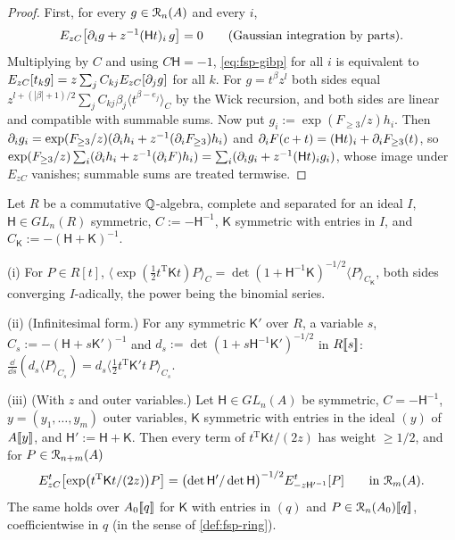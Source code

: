 \begin{proof}
First, for every $g\in\mathcal{R}_n(A)$ and every $i$,
\begin{equation}
\label{eq:fsp-gibp}
E_{zC}\bigl[\partial_ig+z^{-1}(\mathsf Ht)_i\,g\bigr]=0\qquad\text{(Gaussian integration by parts).}
\end{equation}
Multiplying by $C$ and using $C\mathsf H=-1$, \eqref{eq:fsp-gibp} for all $i$ is equivalent to $E_{zC}[t_kg]=z\sum_jC_{kj}E_{zC}[\partial_jg]$ for all $k$. For $g=t^\beta z^l$ both sides equal $z^{l+(|\beta|+1)/2}\sum_jC_{kj}\beta_j\langle t^{\beta-e_j}\rangle_C$ by the Wick recursion, and both sides are linear and compatible with summable sums. Now put $g_i:=\exp(F_{\geq3}/z)h_i$. Then $\partial_ig_i=\exp(F_{\geq3}/z)(\partial_ih_i+z^{-1}(\partial_iF_{\geq3})h_i)$ and $\partial_iF(c+t)=(\mathsf Ht)_i+\partial_iF_{\geq3}(t)$, so $\exp(F_{\geq3}/z)\sum_i(\partial_ih_i+z^{-1}(\partial_iF)h_i)=\sum_i(\partial_ig_i+z^{-1}(\mathsf Ht)_ig_i)$, whose image under $E_{zC}$ vanishes; summable sums are treated termwise.
\end{proof}

\begin{lem}
\label{lem:fsp-pg}
Let $R$ be a commutative $\mathbb{Q}$-algebra, complete and separated for an ideal $I$, $\mathsf H\in GL_n(R)$ symmetric, $C:=-\mathsf H^{-1}$, $\mathsf K$ symmetric with entries in $I$, and $C_{\mathsf K}:=-(\mathsf H+\mathsf K)^{-1}$.

(i) For $P\in R[t]$, $\langle\exp(\frac12t^{\mathrm T}\mathsf Kt)P\rangle_C=\det(1+\mathsf H^{-1}\mathsf K)^{-1/2}\langle P\rangle_{C_{\mathsf K}}$, both sides converging $I$-adically, the power being the binomial series.

(ii) (Infinitesimal form.) For any symmetric $\mathsf K'$ over $R$, a variable $s$, $C_s:=-(\mathsf H+s\mathsf K')^{-1}$ and $d_s:=\det(1+s\mathsf H^{-1}\mathsf K')^{-1/2}$ in $R[\![ s ]\!]$: $\frac{\dd}{\dd s}(d_s\langle P\rangle_{C_s})=d_s\langle\frac12t^{\mathrm T}\mathsf K't\,P\rangle_{C_s}$.

(iii) (With $z$ and outer variables.) Let $\mathsf H\in GL_n(A)$ be symmetric, $C=-\mathsf H^{-1}$, $y=(y_1,\dots,y_m)$ outer variables, $\mathsf K$ symmetric with entries in the ideal $(y)$ of $A[\![ y ]\!]$, and $\mathsf H':=\mathsf H+\mathsf K$. Then every term of $t^{\mathrm T}\mathsf Kt/(2z)$ has weight $\geq1/2$, and for $P\in\mathcal{R}_{n+m}(A)$
\[
E^t_{zC}\bigl[\exp\bigl(t^{\mathrm T}\mathsf Kt/(2z)\bigr)P\bigr]=\bigl(\det\mathsf H'/\det\mathsf H\bigr)^{-1/2}E^t_{-z\mathsf H'^{-1}}[P]\qquad\text{in }\mathcal{R}_m(A).
\]
The same holds over $A_0[\![ q ]\!]$ for $\mathsf K$ with entries in $(q)$ and $P\in\mathcal{R}_n(A_0)[\![ q ]\!]$, coefficientwise in $q$ (in the sense of \cref{def:fsp-ring}).
\end{lem}

